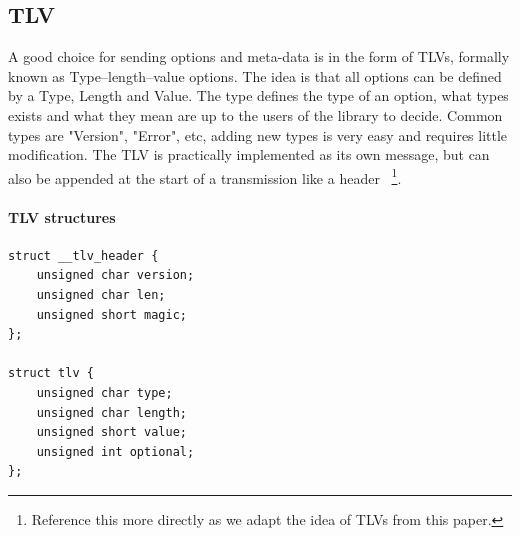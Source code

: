 \documentclass[a4paper,english, 11pt]{report}
\begin{document}
%
%    
%
%    
%

\subsection{TLV}
A good choice for sending options and meta-data is in the form of TLVs, formally known as Type–length–value options.
The idea is that all options can be defined by a Type, Length and Value. The type defines the type of an option, what types exists and what they mean are up to the users of the library to decide. Common types are "Version", "Error", etc, adding new types is very easy and requires little modification. The TLV is practically implemented as its own message, but can also be appended at the start of a transmission like a header ~\cite{rfc8803}\footnote{Reference this more directly as we adapt the idea of TLVs from this paper.}.\\

\noindent\begin{minipage}{\linewidth}
\paragraph{TLV structures}
\begin{verbatim}
struct __tlv_header {
    unsigned char version;
    unsigned char len;
    unsigned short magic;
};

struct tlv {
    unsigned char type;
    unsigned char length;
    unsigned short value;
    unsigned int optional;
};
\end{verbatim}
\end{minipage}
\end{document}
